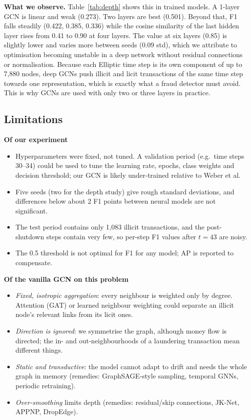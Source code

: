 \documentclass[11pt,a4paper]{article}
\begin{document}
\textbf{What we observe.} Table~\ref{tab:depth} shows this in trained models. A 1-layer GCN is linear and weak (0.273). Two layers are
best (0.501). Beyond that, F1 falls steadily (0.422, 0.385, 0.336) while the cosine similarity of the last hidden layer rises from 0.41
to 0.90 at four layers. The value at six layers (0.85) is slightly lower and varies more between seeds (0.09 std), which we attribute to
optimisation becoming unstable in a deep network without residual connections or normalisation. Because each Elliptic time step is its
own component of up to 7,880 nodes, deep GCNs push illicit and licit transactions of the same time step towards one representation,
which is exactly what a fraud detector must avoid. This is why GCNs are used with only two or three layers in practice.

\subsection{Limitations}
\textbf{Of our experiment}
\begin{itemize}
  \item Hyperparameters were fixed, not tuned. A validation period (e.g.\ time steps 30--34) could be used to tune the learning rate,
        epochs, class weights and decision threshold; our GCN is likely under-trained relative to Weber et al.
  \item Five seeds (two for the depth study) give rough standard deviations, and differences below about 2 F1 points between
        neural models are not significant.
  \item The test period contains only 1,083 illicit transactions, and the post-shutdown steps contain very few, so per-step F1
        values after $t=43$ are noisy.
  \item The 0.5 threshold is not optimal for F1 for any model; AP is reported to compensate.
\end{itemize}
\textbf{Of the vanilla GCN on this problem}
\begin{itemize}
  \item \emph{Fixed, isotropic aggregation}: every neighbour is weighted only by degree. Attention (GAT) or learned neighbour
        weighting could separate an illicit node's relevant links from its licit ones.
  \item \emph{Direction is ignored}: we symmetrise the graph, although money flow is directed; the in- and out-neighbourhoods of a
        laundering transaction mean different things.
  \item \emph{Static and transductive}: the model cannot adapt to drift and needs the whole graph in memory
        (remedies: GraphSAGE-style sampling, temporal GNNs, periodic retraining).
  \item \emph{Over-smoothing} limits depth (remedies: residual/skip connections, JK-Net, APPNP, DropEdge).
\end{itemize}
\end{document}
